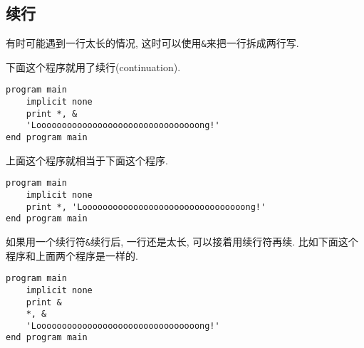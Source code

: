 \subsection{续行}

有时可能遇到一行太长的情况, 这时可以使用\verb|&|来把一行拆成两行写.

下面这个程序就用了续行(continuation).
\begin{verbatim}
program main
    implicit none
    print *, &
    'Loooooooooooooooooooooooooooooooong!'
end program main
\end{verbatim}
上面这个程序就相当于下面这个程序.
\begin{verbatim}
program main
    implicit none
    print *, 'Loooooooooooooooooooooooooooooooong!'
end program main
\end{verbatim}

如果用一个续行符\verb|&|续行后, 一行还是太长, 可以接着用续行符再续. 比如下面这个程序和上面两个程序是一样的.
\begin{verbatim}
program main
    implicit none
    print &
    *, &
    'Loooooooooooooooooooooooooooooooong!'
end program main
\end{verbatim}

